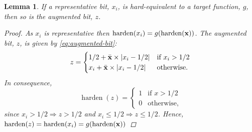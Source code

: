\documentclass{article}
\theoremstyle{plain}
\newtheorem{lemma}[theorem]{Lemma}
\theoremstyle{definition}
\theoremstyle{remark}
\begin{document}
\begin{lemma}\label{prop:augmented}
	If a representative bit, $x_{i}$, is hard-equivalent to a target function, $g$, then so is the augmented bit, $z$.
	\begin{proof}
		As $x_{i}$ is representative then $\operatorname{harden}(x_{i}) = g(\operatorname{harden}({\bf x}))$. The augmented bit, $z$, is given by  \eqref{eq:augmented-bit}:
		\begin{equation*}
		z = \begin{cases}
		1/2 + \bar{\bf x}\times|x_{i} - 1/2| & \text{if } x_{i} > 1/2 \\
		x_{i} + \bar{\bf x}\times|x_{i} - 1/2| & \text{otherwise.}
		\end{cases}
		\end{equation*}
		In consequence,
		\begin{equation*}
		\operatorname{harden}(z) = \begin{cases}
		1 & \text{if } x > 1/2 \\
		0 & \text{otherwise,}
		\end{cases}
		\end{equation*}
		since $x_{i} > 1/2 \Rightarrow z > 1/2$ and $x_{i} \leq 1/2 \Rightarrow z \leq 1/2$. Hence, $\operatorname{harden}(z) = \operatorname{harden}(x_{i}) = g(\operatorname{harden}({\bf x}))$
	\end{proof}
\end{lemma}
\end{document}
